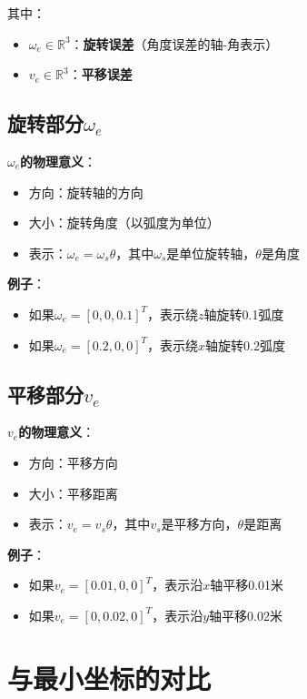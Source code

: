\documentclass[12pt,a4paper]{article}
\begin{document}
其中：
\begin{itemize}
\item $\omega_e \in \mathbb{R}^3$：\textbf{旋转误差}（角度误差的轴-角表示）
\item $v_e \in \mathbb{R}^3$：\textbf{平移误差}
\end{itemize}

\subsection{旋转部分$\omega_e$}

\textbf{$\omega_e$的物理意义}：
\begin{itemize}
\item 方向：旋转轴的方向
\item 大小：旋转角度（以弧度为单位）
\item 表示：$\omega_e = \omega_s \theta$，其中$\omega_s$是单位旋转轴，$\theta$是角度
\end{itemize}

\textbf{例子}：
\begin{itemize}
\item 如果$\omega_e = [0, 0, 0.1]^T$，表示绕$z$轴旋转0.1弧度
\item 如果$\omega_e = [0.2, 0, 0]^T$，表示绕$x$轴旋转0.2弧度
\end{itemize}

\subsection{平移部分$v_e$}

\textbf{$v_e$的物理意义}：
\begin{itemize}
\item 方向：平移方向
\item 大小：平移距离
\item 表示：$v_e = v_s \theta$，其中$v_s$是平移方向，$\theta$是距离
\end{itemize}

\textbf{例子}：
\begin{itemize}
\item 如果$v_e = [0.01, 0, 0]^T$，表示沿$x$轴平移0.01米
\item 如果$v_e = [0, 0.02, 0]^T$，表示沿$y$轴平移0.02米
\end{itemize}

\section{与最小坐标的对比}
\end{document}
